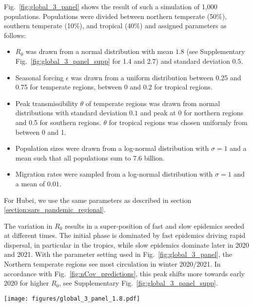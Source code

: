 \documentclass[rmp, reprint, superscriptaddress, floatfix,amsmath]{revtex4-1}
\begin{document}
Fig.~\ref{fig:global_3_panel} shows the result of such a simulation of 1,000 populations.
Populations were divided between northern temperate (50\%), southern temperate (10\%), and tropical (40\%) and assigned parameters as follows:
\begin{itemize}
    \item $R_0$ was drawn from a normal distribution with mean $1.8$ (see Supplementary Fig.~\ref{fig:global_3_panel_supp} for 1.4 and 2.7) and standard deviation $0.5$.
    \item Seasonal forcing $\epsilon$ was drawn from a uniform distribution between 0.25 and 0.75 for temperate regions, between 0 and 0.2 for tropical regions.
    \item Peak transmissibility $\theta$ of temperate regions was drawn from normal distributions with standard deviation $0.1$ and peak at $0$ for northern regions and 0.5 for southern regions. $\theta$ for tropical regions was chosen uniformly from between 0 and 1. %
    \item Population sizes were drawn from a log-normal distribution with $\sigma=1$ and a mean such that all populations sum to $7.6$ billion.
    \item Migration rates were sampled from a log-normal distribution with $\sigma=1$ and a mean of $0.01$.
\end{itemize}
For Hubei, we use the same parameters as described in section \ref{section:sars_pandemic_regional}.%

The variation in $R_0$ results in a super-position of fast and slow epidemics seeded at different times.
The initial phase is dominated by fast epidemics driving rapid dispersal, in particular in the tropics, while slow epidemics dominate later in 2020 and 2021.
With the parameter setting used in Fig.~\ref{fig:global_3_panel}, the Northern temperate regions see most circulation in winter 2020/2021. 
In accordance with Fig.~\ref{fig:nCov_predictions}, this peak shifts more towards early 2020 for higher $R_0$, see Supplementary Fig.~\ref{fig:global_3_panel_supp}.

\begin{figure*}[tb]
    \centering
    \texttt{[image: figures/global\_3\_panel\_1.8.pdf]}
    \caption{{\bf Extended circulation through overlapping epidemics in variable subpopulations.} These simulations of a pandemic scenario assume 1,000 sub-populations with an average $\langle R_0\rangle$ of 1.8 and standard deviation $0.5$, 40\% of which have weak seasonal variation $\epsilon \in [0,0.2]$ (tropical) and the remainder have strong variation with $\epsilon \in [0.25,0.75]$. The super-position of many variable epidemics can result in a global prevalence that decays only slowly through 2020 and 2021. 
    Lighter lines have lower $R_0$, darker lines have higher $R_0$. 
    The actual observed case counts reported for Hubei are added (brown line) and multiplied by three to account for possible under-reporting of mild cases. A subset of 30 randomly chosen simulations are plotted for each region.
    Analogous figures for different $R_0$ parameter values are shown in Supplementary Fig.~\ref{fig:global_3_panel_supp}.}
    \label{fig:global_3_panel}
\end{figure*}
\end{document}
